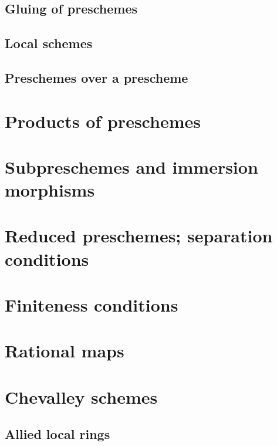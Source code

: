        \subsection{Gluing of preschemes}
        

        \subsection{Local schemes}
        

        \subsection{Preschemes over a prescheme}
        

    \section{Products of preschemes}

    \section{Subpreschemes and immersion morphisms}

    \section{Reduced preschemes; separation conditions}

    \section{Finiteness conditions}

    \section{Rational maps}

    \section{Chevalley schemes}

        \subsection{Allied local rings}
        

